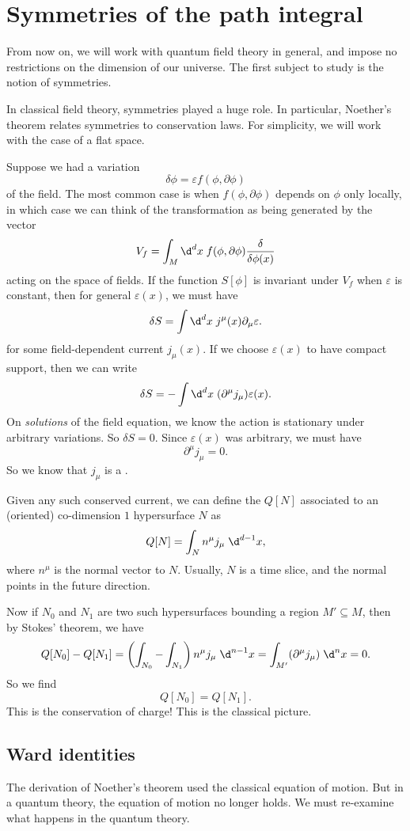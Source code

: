 \documentclass[a4paper]{article}
\begin{document}
\section{Symmetries of the path integral}
From now on, we will work with quantum field theory in general, and impose no restrictions on the dimension of our universe. The first subject to study is the notion of symmetries.

In classical field theory, symmetries played a huge role. In particular, Noether's theorem relates symmetries to conservation laws. For simplicity, we will work with the case of a flat space.

Suppose we had a variation
\[
  \delta \phi = \varepsilon f(\phi, \partial \phi)
\]
of the field. The most common case is when $f(\phi, \partial \phi)$ depends on $\phi$ only locally, in which case we can think of the transformation as being generated by the vector
\[
  V_f = \int_M \d^d x \; f(\phi, \partial \phi) \frac{\delta}{\delta \phi(x)}
\]
acting on the space of fields. If the function $S[\phi]$ is invariant under $V_f$ when $\varepsilon$ is constant, then for general $\varepsilon(x)$, we must have
\[
  \delta S = \int \d^d x\; j^\mu(x) \partial_\mu \varepsilon.
\] %
for some field-dependent current $j_\mu(x)$. If we choose $\varepsilon(x)$ to have compact support, then we can write
\[
  \delta S = - \int \d^d x\; (\partial^\mu j_\mu) \varepsilon(x).
\]
On \emph{solutions} of the field equation, we know the action is stationary under arbitrary variations. So $\delta S = 0$. Since $\varepsilon(x)$ was arbitrary, we must have
\[
  \partial^\mu j_\mu = 0.
\]
So we know that $j_\mu$ is a .

Given any such conserved current, we can define the  $Q[N]$ associated to an (oriented) co-dimension $1$ hypersurface $N$ as
\[
  Q[N] = \int_N n^\mu j_\mu\; \d^{d - 1}x,
\]
where $n^\mu$ is the normal vector to $N$. Usually, $N$ is a time slice, and the normal points in the future direction.

Now if $N_0$ and $N_1$ are two such hypersurfaces bounding a region $M' \subseteq M$, then by Stokes' theorem, we have
\[
  Q[N_0] - Q[N_1] = \left(\int_{N_0} - \int_{N_1}\right) n^\mu j_\mu \;\d^{n - 1}x = \int_{M'} (\partial^\mu j_\mu)\;\d^n x = 0.
\]
So we find
\[
  Q[N_0] = Q[N_1].
\]
This is the conservation of charge! This is the classical picture.

\subsection{Ward identities}
The derivation of Noether's theorem used the classical equation of motion. But in a quantum theory, the equation of motion no longer holds. We must re-examine what happens in the quantum theory.
\end{document}
